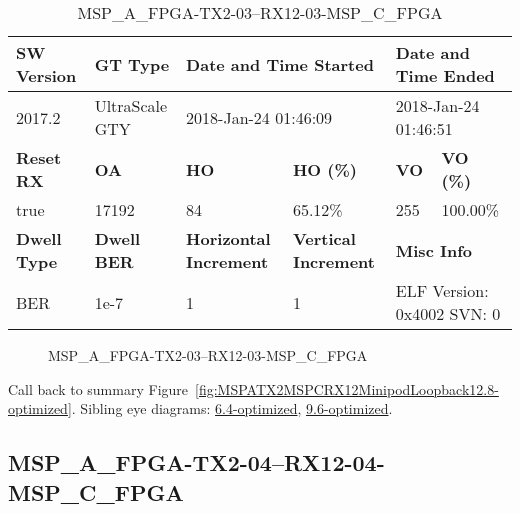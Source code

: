 \begin{table}[h]
\centering
\caption{MSP\_A\_FPGA-TX2-03--RX12-03-MSP\_C\_FPGA}
\label{tab:MSPAFPGATX203RX1203MSPCFPGA12.8-optimized}
\begin{tabular}{@{}|l|l|l|l|l|l|@{}}
\toprule
\textbf{SW Version}                & \textbf{GT Type}   & \multicolumn{2}{l|}{\textbf{Date and Time Started}}            & \multicolumn{2}{l|}{\textbf{Date and Time Ended}}        \\ \midrule
2017.2                       & UltraScale GTY          & \multicolumn{2}{l|}{2018-Jan-24 01:46:09}                   & \multicolumn{2}{l|}{2018-Jan-24 01:46:51}               \\ \midrule
\textbf{Reset RX}                  & \textbf{OA} & \textbf{HO}   & \textbf{HO (\%)} & \textbf{VO} & \textbf{VO (\%)} \\ \midrule
true & 17192        & 84          & 65.12\%        & 255        & 100.00\%       \\ \midrule
\textbf{Dwell Type}                & \textbf{Dwell BER} & \textbf{Horizontal Increment} & \textbf{Vertical Increment}    & \multicolumn{2}{l|}{\textbf{Misc Info}}                  \\ \midrule
BER                            & 1e-7        & 1        & 1           & \multicolumn{2}{l|}{ELF Version: 0x4002 SVN: 0}                         \\ \bottomrule
\end{tabular}
\end{table}

\begin{figure}[h]
\caption{MSP\_A\_FPGA-TX2-03--RX12-03-MSP\_C\_FPGA} \label{fig:MSPAFPGATX203RX1203MSPCFPGA12.8-optimized}
\end{figure}

Call back to summary Figure~\ref{fig:MSPATX2MSPCRX12MinipodLoopback12.8-optimized}.
Sibling eye diagrams: \hyperref[sec:MSPAFPGATX203RX1203MSPCFPGA6.4-optimized]{6.4-optimized}, \hyperref[sec:MSPAFPGATX203RX1203MSPCFPGA9.6-optimized]{9.6-optimized}.

\clearpage
\newpage


\subsection{MSP\_A\_FPGA-TX2-04--RX12-04-MSP\_C\_FPGA}\label{sec:MSPAFPGATX204RX1204MSPCFPGA12.8-optimized}

